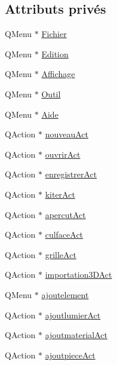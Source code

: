 \subsection*{Attributs privés}
\begin{DoxyCompactItemize}
\item 
Q\+Menu $\ast$ \hyperlink{class_main_window_ac5ad5607ac4e015f5b594aa73ca6703a}{Fichier}
\item 
Q\+Menu $\ast$ \hyperlink{class_main_window_af32c5a214657e6a6dd30269f81c8b450}{Edition}
\item 
Q\+Menu $\ast$ \hyperlink{class_main_window_a77f24d5ff1220ea72f7730d20672911c}{Affichage}
\item 
Q\+Menu $\ast$ \hyperlink{class_main_window_a8763d8624da754aef58d119d70462e60}{Outil}
\item 
Q\+Menu $\ast$ \hyperlink{class_main_window_ab9d17ad44a1ac962e46ac4af1a5732a0}{Aide}
\item 
Q\+Action $\ast$ \hyperlink{class_main_window_a193a37a0da1d22c48c64af3f6c5a6c51}{nouveau\+Act}
\item 
Q\+Action $\ast$ \hyperlink{class_main_window_ac02355cedb6a7337d9ee55d91dd9a4c0}{ouvrir\+Act}
\item 
Q\+Action $\ast$ \hyperlink{class_main_window_aaf23ba5444a4264c5c53fec9b729b2ba}{enregistrer\+Act}
\item 
Q\+Action $\ast$ \hyperlink{class_main_window_ac1517849e119e00fbbebe90570eabade}{kiter\+Act}
\item 
Q\+Action $\ast$ \hyperlink{class_main_window_a26d7fbeaa5d928206325ccccc9ed82c9}{apercut\+Act}
\item 
Q\+Action $\ast$ \hyperlink{class_main_window_acc241f6a81ac7e252fac333e8e725da3}{culface\+Act}
\item 
Q\+Action $\ast$ \hyperlink{class_main_window_a28c1cca30ba2fe676455f847c6f4a60a}{grille\+Act}
\item 
Q\+Action $\ast$ \hyperlink{class_main_window_a5c1ee7709fa8c1f29d7df9ee04b74ab8}{importation3\+D\+Act}
\item 
Q\+Menu $\ast$ \hyperlink{class_main_window_a6c2ded3bdffc863604d7890c554578d5}{ajoutelement}
\item 
Q\+Action $\ast$ \hyperlink{class_main_window_a04b22ecfd14e02f1dd5a5dd77b509f8e}{ajoutlumier\+Act}
\item 
Q\+Action $\ast$ \hyperlink{class_main_window_ae531eca2b9941c7f260f466edd97790e}{ajoutmaterial\+Act}
\item 
Q\+Action $\ast$ \hyperlink{class_main_window_a150ff31dd92454823cf92bd6d4d1852d}{ajoutpiece\+Act}

\end{DoxyCompactItemize}
